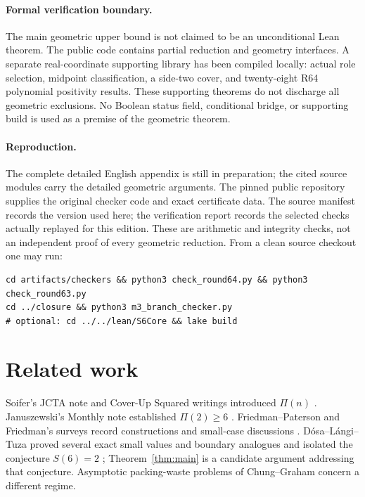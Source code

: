 \documentclass[11pt,reqno]{amsart}
\theoremstyle{definition}
\begin{document}
\paragraph{Formal verification boundary.}
The main geometric upper bound is not claimed to be an unconditional Lean
theorem. The public code contains partial reduction and geometry interfaces.
A separate real-coordinate supporting library has been compiled locally:
actual role selection, midpoint classification, a side-two cover, and twenty-eight
R64 polynomial positivity results. These supporting theorems do not discharge
all geometric exclusions. No Boolean status field, conditional bridge, or
supporting build is used as a premise of the geometric theorem.

\paragraph{Reproduction.}
The complete detailed English appendix is still in preparation; the cited source modules carry the detailed geometric arguments.
The pinned public repository supplies the original checker code and exact
certificate data. The source manifest records the version used here; the
verification report records the selected checks actually replayed for this
edition. These are arithmetic and integrity checks, not an independent proof
of every geometric reduction. From a clean source checkout one may run:
\begin{verbatim}
cd artifacts/checkers && python3 check_round64.py && python3 check_round63.py
cd ../closure && python3 m3_branch_checker.py
# optional: cd ../../lean/S6Core && lake build
\end{verbatim}

\section{Related work}\label{sec:related}

Soifer's JCTA note and Cover-Up Squared writings introduced $\Pi(n)$
\cite{Soifer2006,SoiferCoverUp}.
Januszewski's Monthly note established $\Pi(2)\ge 6$ \cite{Januszewski2009}.
Friedman--Paterson and Friedman's surveys record constructions and small-case
discussions \cite{FriedmanPaterson2006,FriedmanCovering}.
D\'osa--L\'angi--Tuza proved several exact small values and boundary analogues
and isolated the conjecture $S(6)=2$ \cite{DLT2026}; Theorem~\ref{thm:main}
is a candidate argument addressing that conjecture.
Asymptotic packing-waste problems of Chung--Graham
\cite{ChungGraham2009,ChungGraham2020} concern a different regime.
\end{document}
